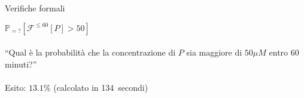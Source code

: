 \begin {frame}
\begin{columns}[t]
\begin{block}{Verifiche formali}
			\begin{center}
			$\mathbb{P}_{=?} [\mathcal{F}^{\leq 60} [P] > 50]$
			\\\leavevmode\\\leavevmode
				``Qual \`e la probabilit\`a che la concentrazione di $P$ sia maggiore di $50 \mu M$ entro 60 minuti?''
				\\\leavevmode\\\leavevmode
				Esito: $13.1\%$ (calcolato in 134~secondi)
				\\\leavevmode
			\end{center}
		\end{block}
\end{columns}






\end{frame}

